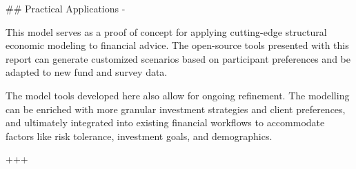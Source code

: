 ## Practical Applications {-}

This model serves as a proof of concept for applying cutting-edge structural economic modeling to financial advice. The open-source tools presented with this report can generate customized scenarios based on participant preferences and be adapted to new fund and survey data.

The model tools developed here also allow for ongoing refinement. The modelling can be enriched with more granular investment strategies and client preferences, and ultimately integrated into existing financial workflows to accommodate factors like risk tolerance, investment goals, and demographics.

+++